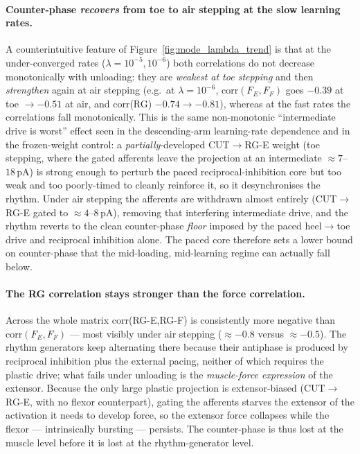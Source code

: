\paragraph{Counter-phase \emph{recovers} from toe to air stepping at the
slow learning rates.}
A counterintuitive feature of Figure~\ref{fig:mode_lambda_trend} is that at
the under-converged rates ($\lambda=10^{-5},10^{-6}$) both correlations do not
decrease monotonically with unloading: they are \emph{weakest at toe stepping}
and then \emph{strengthen} again at air stepping (e.g.\ at $\lambda=10^{-6}$,
corr$(F_E,F_F)$ goes $-0.39$ at toe $\to -0.51$ at air, and corr(RG) $-0.74\to
-0.81$), whereas at the fast rates the correlations fall monotonically. This is
the same non-monotonic ``intermediate drive is worst'' effect seen in the
descending-arm learning-rate dependence and in the frozen-weight control: a
\emph{partially}-developed CUT$\to$RG-E weight (toe stepping, where the gated
afferents leave the projection at an intermediate $\approx7$--$18$\,pA) is
strong enough to perturb the paced reciprocal-inhibition core but too weak and
too poorly-timed to cleanly reinforce it, so it desynchronises the rhythm. Under
air stepping the afferents are withdrawn almost entirely (CUT$\to$RG-E gated to
$\approx4$--$8$\,pA), removing that interfering intermediate drive, and the
rhythm reverts to the clean counter-phase \emph{floor} imposed by the paced
heel$\to$toe drive and reciprocal inhibition alone. The paced core therefore
sets a lower bound on counter-phase that the mid-loading, mid-learning regime
can actually fall below.

\paragraph{The RG correlation stays stronger than the force correlation.}
Across the whole matrix corr(RG-E,RG-F) is consistently more negative than
corr$(F_E,F_F)$ --- most visibly under air stepping ($\approx-0.8$ versus
$\approx-0.5$). The rhythm generators keep alternating there because their
antiphase is produced by reciprocal inhibition plus the external pacing, neither
of which requires the plastic drive; what fails under unloading is the
\emph{muscle-force expression} of the extensor. Because the only large plastic
projection is extensor-biased (CUT$\to$RG-E, with no flexor counterpart), gating
the afferents starves the extensor of the activation it needs to develop force,
so the extensor force collapses while the flexor --- intrinsically bursting ---
persists. The counter-phase is thus lost at the muscle level before it is lost
at the rhythm-generator level.

